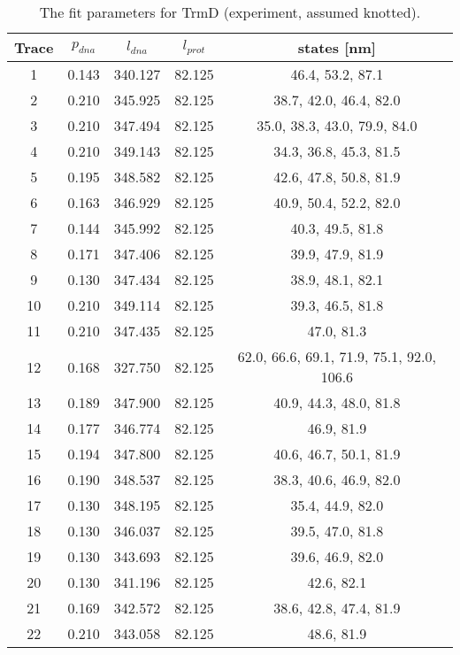 \begin{table}
    \tiny
    \centering
    \caption{The fit parameters for TrmD (experiment, assumed knotted).}
    \label{tab:trmd-fit-parameters-exp-knotted}
    \begin{tabular}{c|c|c|c|c}
        \textbf{Trace} & $p_{dna}$ & $l_{dna}$ & $l_{prot}$ & states [nm]\\\hline
        1 & 0.143 & 340.127 & 82.125 & 46.4, 53.2, 87.1\\
        2 & 0.210 & 345.925 & 82.125 & 38.7, 42.0, 46.4, 82.0\\
        3 & 0.210 & 347.494 & 82.125 & 35.0, 38.3, 43.0, 79.9, 84.0\\
        4 & 0.210 & 349.143 & 82.125 & 34.3, 36.8, 45.3, 81.5\\
        5 & 0.195 & 348.582 & 82.125 & 42.6, 47.8, 50.8, 81.9\\
        6 & 0.163 & 346.929 & 82.125 & 40.9, 50.4, 52.2, 82.0\\
        7 & 0.144 & 345.992 & 82.125 & 40.3, 49.5, 81.8\\
        8 & 0.171 & 347.406 & 82.125 & 39.9, 47.9, 81.9\\
        9 & 0.130 & 347.434 & 82.125 & 38.9, 48.1, 82.1\\
        10 & 0.210 & 349.114 & 82.125 & 39.3, 46.5, 81.8\\
        11 & 0.210 & 347.435 & 82.125 & 47.0, 81.3\\
        12 & 0.168 & 327.750 & 82.125 & 62.0, 66.6, 69.1, 71.9, 75.1, 92.0, 106.6\\
        13 & 0.189 & 347.900 & 82.125 & 40.9, 44.3, 48.0, 81.8\\
        14 & 0.177 & 346.774 & 82.125 & 46.9, 81.9\\
        15 & 0.194 & 347.800 & 82.125 & 40.6, 46.7, 50.1, 81.9\\
        16 & 0.190 & 348.537 & 82.125 & 38.3, 40.6, 46.9, 82.0\\
        17 & 0.130 & 348.195 & 82.125 & 35.4, 44.9, 82.0\\
        18 & 0.130 & 346.037 & 82.125 & 39.5, 47.0, 81.8\\
        19 & 0.130 & 343.693 & 82.125 & 39.6, 46.9, 82.0\\
        20 & 0.130 & 341.196 & 82.125 & 42.6, 82.1\\
        21 & 0.169 & 342.572 & 82.125 & 38.6, 42.8, 47.4, 81.9\\
        22 & 0.210 & 343.058 & 82.125 & 48.6, 81.9\\

\end{tabular}
\end{table}

